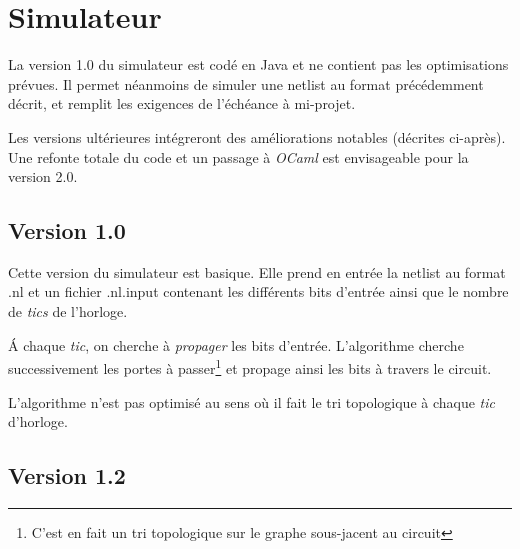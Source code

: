 \documentclass{article}
\begin{document}
\section{Simulateur}
La version 1.0 du simulateur est codé en Java et ne contient pas les optimisations prévues. Il permet néanmoins de simuler une netlist au format précédemment décrit, et remplit les exigences de l'échéance à mi-projet.

Les versions ultérieures intégreront des améliorations notables (décrites ci-après). Une refonte totale du code et un passage à \emph{OCaml} est envisageable pour la version 2.0.

\subsection{Version 1.0}
Cette version du simulateur est basique. Elle prend en entrée la netlist au format .nl et un fichier .nl.input contenant les différents bits d'entrée ainsi que le nombre de \emph{tics} de l'horloge.

\'A chaque \emph{tic}, on cherche à \emph{propager} les bits d'entrée. L'algorithme cherche successivement les portes à passer\footnote{C'est en fait un tri topologique sur le graphe sous-jacent au circuit} et propage ainsi les bits à travers le circuit.

L'algorithme n'est pas optimisé au sens où il fait le tri topologique à chaque \emph{tic} d'horloge.

\subsection{Version 1.2}
\end{document}
